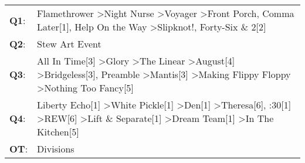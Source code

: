 \begin{supertabular}{p{0.03\textwidth}p{0.92\textwidth}}
 \textbf{Q1}:  &                                                                               Flamethrower\textsuperscript{} \textgreater \enspace Night Nurse\textsuperscript{} \textgreater \enspace Voyager\textsuperscript{} \textgreater \enspace Front Porch\textsuperscript{}, \enspace Comma Later[1]\textsuperscript{}, \enspace Help On the Way\textsuperscript{} \textgreater \enspace Slipknot!\textsuperscript{}, \enspace Forty-Six \& 2[2]\textsuperscript{}  \enspace  \\
 \textbf{Q2}:  &                                                                                                                                                                                                                                                                                                                                                                                                                            Stew Art Event\textsuperscript{}  \enspace  \\
 \textbf{Q3}:  &  All In Time[3]\textsuperscript{} \textgreater \enspace Glory\textsuperscript{} \textgreater \enspace The Linear\textsuperscript{} \textgreater \enspace August[4]\textsuperscript{} \textgreater \enspace Bridgeless[3]\textsuperscript{}, \enspace Preamble\textsuperscript{} \textgreater \enspace Mantis[3]\textsuperscript{} \textgreater \enspace Making Flippy Floppy\textsuperscript{} \textgreater \enspace Nothing Too Fancy[5]\textsuperscript{}  \enspace  \\
 \textbf{Q4}:  &  Liberty Echo[1]\textsuperscript{} \textgreater \enspace White Pickle[1]\textsuperscript{} \textgreater \enspace Den[1]\textsuperscript{} \textgreater \enspace Theresa[6]\textsuperscript{}, :30[1]\textsuperscript{} \textgreater \enspace REW[6]\textsuperscript{} \textgreater \enspace Lift \& Separate[1]\textsuperscript{} \textgreater \enspace Dream Team[1]\textsuperscript{} \textgreater \enspace In The Kitchen[5]\textsuperscript{}  \enspace  \\
 \textbf{OT}:  &                                                                                                                                                                                                                                                                                                                                                                                                                                 Divisions\textsuperscript{}  \enspace  \\
\end{supertabular}
